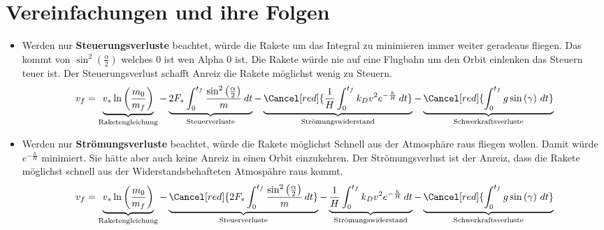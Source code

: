 %
%
%
%
\section{Vereinfachungen und ihre Folgen 
\label{leo:section:vereinfachungen}}
\begin{itemize}
	\item Werden nur \textbf{Steuerungsverluste} beachtet, würde die Rakete um das Integral zu minimieren immer weiter geradeaus fliegen.
	Das kommt von $\sin^2\left( \frac{\alpha}{2}\right) $ welches 0 ist wen Alpha 0 ist.
	Die Rakete würde nie auf eine Flugbahn um den Orbit einlenken das Steuern teuer ist.
	Der Steuerungsverlust schafft Anreiz die Rakete möglichst wenig zu Steuern.
	\begin{equation*}
		v_f = \underbrace{v_* \ln \left(\frac{m_0}{m_f}\right)}_{\text{Raketengleichung}} 
		- \underbrace{2F_* \int_0^{t_f} \frac{\sin^2\left(\frac{\alpha}{2}\right)}{m} \, dt }_{\text{Steuerverluste}}
		- \underbrace{\Cancel[red]{\frac{1}{H} \int_0^{t_f} k_Dv^2 e^{-\frac{h}{H}} \, dt }}_{\text{Strömungswiderstand}}
		- \underbrace{\Cancel[red]{\int_0^{t_f} g \sin \left(\gamma\right) \, dt}}_{\text{Schwerkraftsverluste}}
	\end{equation*}
	
	\item Werden nur \textbf{Strömungsverluste} beachtet, würde die Rakete möglichst Schnell aus der Atmosphäre raus fliegen wollen. Damit würde $e^{-\frac{h}{H}}$ minimiert. 
	Sie hätte aber auch keine Anreiz in einen Orbit einzukehren.
	Der Strömungsverlust ist der Anreiz, dass die Rakete möglichst schnell aus der Widerstandsbehafteten Atmospähre raus kommt.
	\begin{equation*}
		v_f = \underbrace{v_* \ln \left(\frac{m_0}{m_f}\right)}_{\text{Raketengleichung}} 
		- \underbrace{\Cancel[red]{2F_* \int_0^{t_f} \frac{\sin^2\left(\frac{\alpha}{2}\right)}{m} \, dt }}_{\text{Steuerverluste}}
		- \underbrace{\frac{1}{H} \int_0^{t_f} k_Dv^2 e^{-\frac{h}{H}} \, dt }_{\text{Strömungswiderstand}}
		- \underbrace{\Cancel[red]{\int_0^{t_f} g \sin \left(\gamma\right) \, dt}}_{\text{Schwerkraftsverluste}}
	\end{equation*}
	

\end{itemize}
